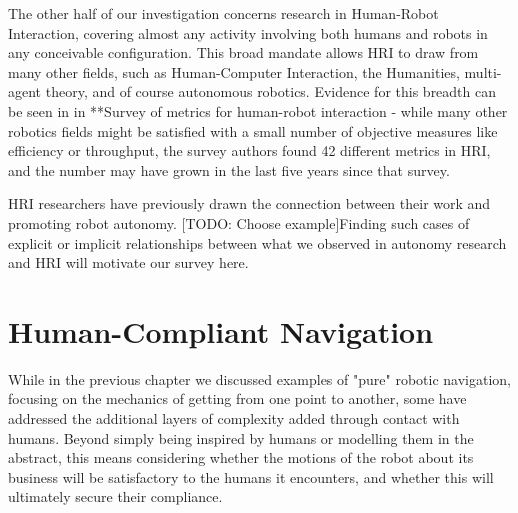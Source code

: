 \documentclass{sfuthesis}
\begin{document}
The other half of our investigation concerns research in Human-Robot Interaction, covering almost any activity involving both humans and robots in any conceivable configuration. This broad mandate allows HRI to draw from many other fields, such as Human-Computer Interaction, the Humanities, multi-agent theory, and of course autonomous robotics. Evidence for this breadth can be seen in in **Survey of metrics for human-robot interaction - while many other robotics fields might be satisfied with a small number of objective measures like efficiency or throughput, the survey authors found 42 different metrics in HRI, and the number may have grown in the last five years since that survey.

HRI researchers have previously drawn the connection between their work and promoting robot autonomy. [TODO: Choose example]Finding such cases of explicit or implicit relationships between what we observed in autonomy research and HRI will motivate our survey here.













\section{Human-Compliant Navigation}

While in the previous chapter we discussed examples of "pure" robotic navigation, focusing on the mechanics of getting from one point to another, some have addressed the additional layers of complexity added through contact with humans. Beyond simply being inspired by humans or modelling them in the abstract, this means considering whether the motions of the robot about its business will be satisfactory to the humans it encounters, and whether this will ultimately secure their compliance.
\end{document}
